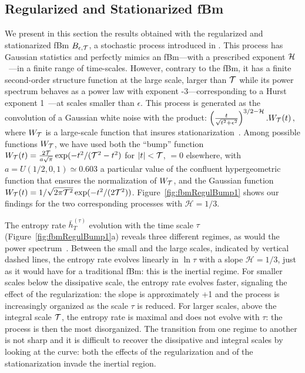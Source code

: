 \documentclass[aps,pra,groupedaddress,notitlepage]{revtex4-1}
\begin{document}

\subsection{Regularized and Stationarized fBm}

We present in this section the results obtained with the regularized and stationarized fBm $B_{\epsilon, {\cal T}}$, a stochastic process introduced in \cite{Pereira2016}. This process has Gaussian statistics and perfectly mimics an fBm---with a prescribed exponent ${\cal H}$~---in a finite range of time-scales. However, contrary to the fBm, it has a finite second-order structure function at the large scale, larger than ${\cal T}$ while its power spectrum behaves as a power law with exponent -3---corresponding to a Hurst exponent 1~---at scales smaller than $\epsilon$. 
This process is generated as the convolution of a Gaussian white noise with the product:  
$
\left( \frac{t}{\sqrt{t^2+\epsilon^2}}\right)^{3/2-{\cal H}}.W_{\cal T}(t) 
\,,
$
where $W_{\cal T}$ is a large-scale function that insures stationarization~\cite{Pereira2016}. Among possible functions $W_{\cal T}$, we have used both the ``bump'' function $W_{\cal T}(t)=\frac{2\cal T}{a\sqrt{\pi}}\exp(-t^2/({\cal T}^2-t^2)$ for $|t|<{\cal T}$, $=0$ elsewhere, with $a=U(1/2,0,1)\simeq 0.603$ a particular value of the confluent hypergeometric function that ensures the normalization of $W_{\cal T}$,
and the Gaussian function $W_{\cal T}(t)=1/\sqrt{2\pi {\cal T}^2}\exp(-t^2/(2{\cal T}^2))$. 
Figure~\ref{fig:fbmRegulBump1} shows our findings for the two corresponding processes with $\mathcal{H}=1/3$.

The entropy rate $\bar{h}_T^{(\tau)}$ evolution with the time scale $\tau$ (Figure~\ref{fig:fbmRegulBump1}a) reveals three different regimes, as would the power spectrum~\cite{GBelinchon2016}.
Between the small and the large scales, indicated by vertical dashed lines, the entropy rate evolves linearly in $\ln\tau$ with a slope $\mathcal{H}=1/3$, just as it would have for a traditional fBm: this is the inertial regime.
For smaller scales below the dissipative scale, the entropy rate evolves faster, signaling the effect of the regularization: the slope is approximately +1 and the process is increasingly organized as the scale $\tau$ is reduced.
For larger scales, above the integral scale ${\cal T}$, the entropy rate is maximal and does not evolve with $\tau$: the process is then the most disorganized.
The transition from one regime to another is not sharp and it is difficult to recover the dissipative and integral scales by looking at the curve: both the effects of the regularization and of the stationarization invade the inertial region.
\end{document}
